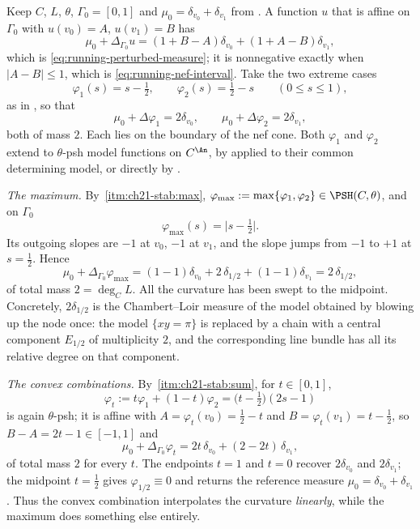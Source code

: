 \begin{example}
\label{ex:ch21-conic-numbers}
Keep \(C\), \(L\), \(\theta\), \(\Gamma_0=[0,1]\) and
\(\mu_0=\delta_{v_0}+\delta_{v_1}\) from
.  A function \(u\) that is affine on
\(\Gamma_0\) with \(u(v_0)=A\), \(u(v_1)=B\) has
\[
 \mu_0+\Delta_{\Gamma_0}u=(1+B-A)\delta_{v_0}+(1+A-B)\delta_{v_1},
\]
which is \eqref{eq:running-perturbed-measure}; it is nonnegative exactly
when \(|A-B|\leq1\), which is \eqref{eq:running-nef-interval}.  Take the two
extreme cases
\[
 \varphi_1(s)=s-\tfrac12,\qquad \varphi_2(s)=\tfrac12-s
 \qquad(0\leq s\leq1),
\]
as in , so that
\[
 \mu_0+\Delta\varphi_1=2\delta_{v_0},
 \qquad
 \mu_0+\Delta\varphi_2=2\delta_{v_1},
\]
both of mass \(2\).  Each lies on the boundary of the nef cone.  Both
\(\varphi_1\) and \(\varphi_2\) extend to \(\theta\)-psh model functions on
\(C^{\An}\), by  applied to their common
determining model, or directly by
.

\emph{The maximum.}  By
\,\cref{itm:ch21-stab:max},
\(\varphi_{\max}:=\max\{\varphi_1,\varphi_2\}\in\PSH(C,\theta)\), and on
\(\Gamma_0\)
\[
 \varphi_{\max}(s)=\bigl|s-\tfrac12\bigr| .
\]
Its outgoing slopes are \(-1\) at \(v_0\), \(-1\) at \(v_1\), and the
slope jumps from \(-1\) to \(+1\) at \(s=\tfrac12\).  Hence
\begin{equation}
\label{eq:ch21-conic-max-measure}
 \mu_0+\Delta_{\Gamma_0}\varphi_{\max}
 =(1-1)\delta_{v_0}+2\,\delta_{1/2}+(1-1)\delta_{v_1}
 =2\,\delta_{1/2},
\end{equation}
of total mass \(2=\deg_CL\).  All the curvature has been swept to the
midpoint.  Concretely, \(2\delta_{1/2}\) is the Chambert--Loir measure of
the model obtained by blowing up the node once: the model
\(\{xy=\pi\}\) is replaced by a chain with a central component
\(E_{1/2}\) of multiplicity \(2\), and the corresponding line bundle has all
its relative degree on that component.

\emph{The convex combinations.}  By
\,\cref{itm:ch21-stab:sum}, for \(t\in[0,1]\),
\[
 \varphi_t:=t\varphi_1+(1-t)\varphi_2
 =\bigl(t-\tfrac12\bigr)(2s-1)
\]
is again \(\theta\)-psh; it is affine with \(A=\varphi_t(v_0)=\tfrac12-t\)
and \(B=\varphi_t(v_1)=t-\tfrac12\), so \(B-A=2t-1\in[-1,1]\) and
\begin{equation}
\label{eq:ch21-conic-convex-measure}
 \mu_0+\Delta_{\Gamma_0}\varphi_t
 =2t\,\delta_{v_0}+(2-2t)\,\delta_{v_1},
\end{equation}
of total mass \(2\) for every \(t\).  The endpoints \(t=1\) and \(t=0\)
recover \(2\delta_{v_0}\) and \(2\delta_{v_1}\); the midpoint \(t=\tfrac12\)
gives \(\varphi_{1/2}\equiv0\) and returns the reference measure
\(\mu_0=\delta_{v_0}+\delta_{v_1}\).  Thus the convex combination
interpolates the curvature \emph{linearly}, while the maximum does something
else entirely.


\end{example}
